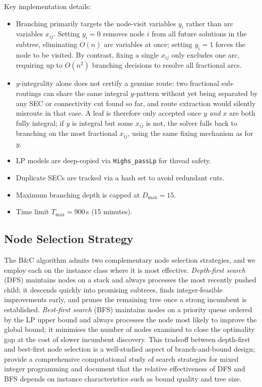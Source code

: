 \documentclass[11pt,a4paper]{article}
\begin{document}
Key implementation details:
\begin{itemize}[nosep]
  \item Branching primarily targets the node-visit variables $y_i$ rather than arc variables $x_{ij}$.
        Setting $y_i = 0$ removes node $i$ from all future solutions in the subtree, eliminating $O(n)$ arc variables at once; setting $y_i = 1$ forces the node to be visited.
        By contrast, fixing a single $x_{ij}$ only excludes one arc, requiring up to $O(n^2)$ branching decisions to resolve all fractional arcs.
  \item $y$-integrality alone does not certify a genuine route: two fractional sub-routings can share the same integral $y$-pattern without yet being separated by any SEC or connectivity cut found so far, and route extraction would silently misroute in that case. A leaf is therefore only accepted once $y$ \emph{and} $x$ are both fully integral; if $y$ is integral but some $x_{ij}$ is not, the solver falls back to branching on the most fractional $x_{ij}$, using the same fixing mechanism as for $y$.
  \item LP models are deep-copied via \texttt{Highs\_passLp} for thread safety.
  \item Duplicate SECs are tracked via a hash set to avoid redundant cuts.
  \item Maximum branching depth is capped at $D_{\max} = 15$.
  \item Time limit $T_{\max} = 900$\,s (15 minutes).
\end{itemize}

\subsection{Node Selection Strategy}
\label{sec:node-selection}

The B\&C algorithm admits two complementary node selection strategies, and we employ each on the instance class where it is most effective.
\emph{Depth-first search} (DFS) maintains nodes on a stack and always processes the most recently pushed child; it descends quickly into promising subtrees, finds integer-feasible improvements early, and prunes the remaining tree once a strong incumbent is established.
\emph{Best-first search} (BFS) maintains nodes on a priority queue ordered by the LP upper bound and always processes the node most likely to improve the global bound; it minimises the number of nodes examined to close the optimality gap at the cost of slower incumbent discovery.
This tradeoff between depth-first and best-first node selection is a well-studied aspect of branch-and-bound design; \citet{linderoth1999computational} provide a comprehensive computational study of search strategies for mixed integer programming and document that the relative effectiveness of DFS and BFS depends on instance characteristics such as bound quality and tree size.
\end{document}
